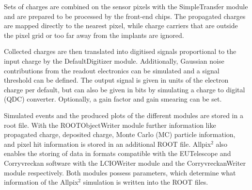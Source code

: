 Sets of charges are combined on the sensor pixels with the SimpleTransfer module and are prepared  to be processed by the front-end chips. The
propagated charges are mapped directly to the nearest pixel, while charge carriers that are outside the pixel grid or too far away from the implants are ignored.

Collected charges are then translated into digitised signals proportional to the input charge by the DefaultDigitizer module. Additionally, Gaussian noise contributions
from the readout electronics can be simulated and a signal threshold can be defined. The output signal is given in units of the electron charge per default, but
can also be given in bits by simulating a charge to digital (QDC) converter. Optionally, a gain factor and gain smearing can be set.

Simulated events and the produced plots of the different modules are stored in a root file. With the ROOTObjectWriter module further information like propagated charge,
deposited charge, Monte Carlo (MC) particle information, and pixel hit information is stored in an additional ROOT file. Allpix$^2$ also enables the storing of
data in formats compatible with the EUTelescope and Corryvreckan software with the LCIOWriter module and the CorryvreckanWriter module respectively. Both modules possess parameters, which
determine what information of the Allpix$^2$ simulation is written into the ROOT files.

